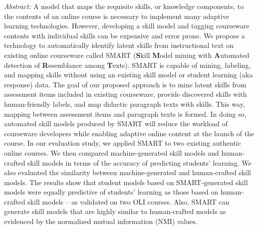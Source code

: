 \documentclass[letterpaper,11pt,oneside]{book} %
\begin{document}
\emph{Abstract:} A model that maps the requisite skills, or knowledge
components, to the contents of an online course is necessary to
implement many adaptive learning technologies. However, developing a
skill model and tagging courseware contents with individual skills can
be expensive and error prone. We propose a technology to automatically
identify latent skills from instructional text on existing online
courseware called SMART (\textbf{S}kill \textbf{M}odel mining with
\textbf{A}utomated detection of \textbf{R}esemblance among
\textbf{T}exts). SMART is capable of mining, labeling, and mapping
skills without using an existing skill model or student learning (aka
response) data. The goal of our proposed approach is to mine latent
skills from assessment items included in existing courseware, provide
discovered skills with human-friendly labels, and map didactic paragraph
texts with skills. This way, mapping between assessment items and
paragraph texts is formed. In doing so, automated skill models produced
by SMART will reduce the workload of courseware developers while
enabling adaptive online content at the launch of the course. In our
evaluation study, we applied SMART to two existing authentic online
courses. We then compared machine-generated skill models and
human-crafted skill models in terms of the accuracy of predicting
students' learning. We also evaluated the similarity between
machine-generated and human-crafted skill models. The results show that
student models based on SMART-generated skill models were equally
predictive of students' learning as those based on human-crafted skill
models -- as validated on two OLI courses. Also, SMART can generate
skill models that are highly similar to human-crafted models as
evidenced by the normalized mutual information (NMI) values.







\end{document}
